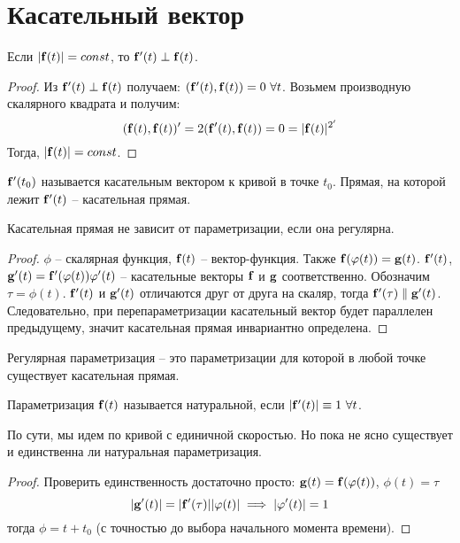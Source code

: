 \documentclass[main]{subfiles}
\begin{document}
\section{Касательный вектор}
\begin{lemma}\label{dfoc:very_important_lemma}
    Если $|\mathbf{f}(t)| = const$, то $\mathbf{f}'(t) \perp \mathbf{f}(t)$.
\end{lemma}
\begin{proof}
    Из $\mathbf{f}'(t) \perp \mathbf{f}(t)$ получаем: $ (\mathbf{f}'(t), \mathbf{f}(t)) = 0\ \forall t$.
    Возьмем производную скалярного квадрата и получим:
    \[(\mathbf{f}(t), \mathbf{f}(t))' = 2(\mathbf{f}'(t), \mathbf{f}(t)) = 0 = |\mathbf{f}(t)|^{2'}\]
    Тогда, $|\mathbf{f}(t)| = const$.
\end{proof}
\begin{definition}
    $\mathbf{f}'(t_0)$ называется касательным вектором к кривой в точке $t_0$.
    Прямая, на которой лежит $\mathbf{f}'(t)$ -- касательная прямая.
\end{definition}
\begin{theorem}
    Касательная прямая не зависит от параметризации, если она регулярна.
\end{theorem}
\begin{proof}
    $\phi$ -- скалярная функция, $\mathbf{f}(t)$ -- вектор-функция.
    Также $\mathbf{f}(\varphi(t)) = \mathbf{g}(t)$.
    $\mathbf{f}'(t)$, $\mathbf{g}'(t) = \mathbf{f}'(\varphi(t)) \varphi'(t)$ -- касательные векторы $\mathbf{f}$ и $\mathbf{g}$ соответственно.
    Обозначим $\tau = \phi(t)$.
    $\mathbf{f}'(t)$ и $\mathbf{g}'(t)$ отличаются друг от друга на скаляр,
    тогда $\mathbf{f}'(\tau) \parallel \mathbf{g}'(t)$.
    Следовательно, при перепараметризации касательный вектор будет параллелен предыдущему, значит касательная прямая инвариантно определена.
\end{proof}
\begin{remark}
    Регулярная параметризация -- это параметризации для которой в любой точке существует касательная прямая.
\end{remark}
\begin{definition}
    Параметризация $\mathbf{f}(t)$ называется натуральной, если $|\mathbf{f}'(t)| \equiv 1\ \forall t$.
\end{definition}
По сути, мы идем по кривой с единичной скоростью.
Но пока не ясно существует и единственна ли натуральная параметризация.
\begin{proof}
    Проверить единственность достаточно просто: $\mathbf{g}(t) = \mathbf{f}(\varphi(t))$, $\phi(t) = \tau$
    \[|\mathbf{g}'(t)| = |\mathbf{f}'(\tau)| |\varphi(t)| \implies |\varphi'(t)| = 1\]
    тогда $\phi = t + t_0$ (с точностью до выбора начального момента времени).
\end{proof}
\end{document}
